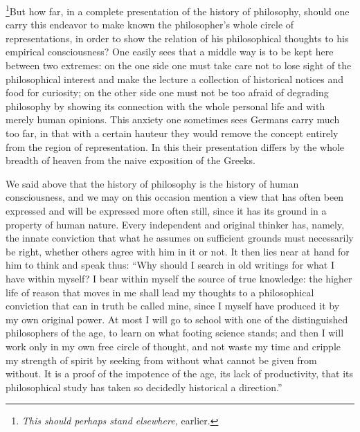 \documentclass[12pt]{article}
\newcommand{\opage}[1]{\marginnote{\footnotesize\textit{[#1]}}}
\begin{document}
\footnote{\emph{This should perhaps stand elsewhere,} earlier.}But how far, in a complete presentation of the history of philosophy, should one carry this endeavor to make known the philosopher's whole circle of representations, in order to show the relation of his philosophical thoughts to his empirical consciousness? One easily sees that a middle way is to be kept here between\opage{7v} two extremes: on the one side one must take care not to lose sight of the philosophical interest and make the lecture a collection of historical notices and food for curiosity; on the other side one must not be too afraid of degrading philosophy by showing its connection with the whole personal life and with merely human opinions. This anxiety one sometimes sees Germans carry much too far, in that with a certain hauteur they would remove the concept entirely from the region of representation. In this their presentation differs by the whole breadth of heaven from the naive exposition of the Greeks.

We said above that the history of philosophy is the history of human consciousness, and we may on this occasion mention a view that has often been expressed and will be expressed more often still, since it has its ground in a property of human nature. Every independent and original thinker has, namely, the innate conviction that what he assumes on sufficient grounds must necessarily be right, whether others agree with him in it or not. It then lies near at hand for him to think and speak thus: ``Why should I search in old writings for what I have within myself? I bear within myself the source of true knowledge: the higher life of reason that moves in me shall lead my thoughts to a philosophical conviction that can in truth be called mine, since I myself have produced it by my own original power. At most I will go to school with one of the distinguished philosophers of the age, to learn on what\opage{8r} footing science stands; and then I will work only in my own free circle of thought, and not waste my time and cripple my strength of spirit by seeking from without what cannot be given from without. It is a proof of the impotence of the age, its lack of productivity, that its philosophical study has taken so decidedly historical a direction.''
\end{document}
